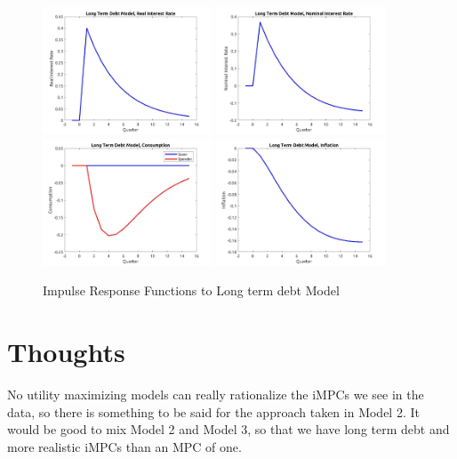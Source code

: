 \documentclass[AER]{AEA}
\begin{document}
 
\begin{figure}
	\includegraphics[width=0.45\textwidth]{../Code/Dynare/Figures/RealRateLT_debt.jpg}
	\includegraphics[width=0.45\textwidth]{../Code/Dynare/Figures/NominalRateLT_debt.jpg}
	\includegraphics[width=0.45\textwidth]{../Code/Dynare/Figures/ConsumptionLT_debt.jpg}
	\includegraphics[width=0.45\textwidth]{../Code/Dynare/Figures/InflationLT_debt.jpg}
	\caption{Impulse Response Functions to Long term debt Model}
	\label{fig:IFRLT}
\end{figure}

\section{Thoughts}
No utility maximizing models can really rationalize the iMPCs we see in the data, so there is something to be said for the approach taken in Model 2. It would be good to mix Model 2 and Model 3, so that we have long term debt and more realistic iMPCs than an MPC of one.
\end{document}
